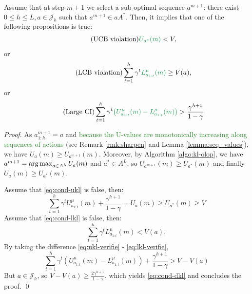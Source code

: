 \documentclass[runningheads, envcountsame, a4paper]{llncs}
\newcommand{\diff}[1]{\textcolor{ForestGreen}{#1}}
\begin{document}
\begin{lemma}
\label{lemma:sub-optimal-pull}
Assume that at step $m+1$ we select a sub-optimal sequence $a^{m+1}$: there exist $0 \leq h \leq L,  a\in \mathcal{J}_h$ such that $a^{m+1} \in aA^*$. Then, it implies that one of the following propositions is true:
\begin{equation}
\label{eq:cond-ukl}
\tag{UCB violation}
    \diff{U_{a^*}(m)} < V,
\end{equation}
or
\begin{equation}
\tag{LCB violation}
\label{eq:cond-lkl}
    \sum_{t=1}^h \gamma^t \diff{L^{\mu}_{a_{1:t}}(m)} \geq V(a),
\end{equation}
or
\begin{equation}
\tag{Large CI}
\label{eq:cond-dkl}
    \sum_{t=1}^h \gamma^t\diff{\left(U^{\mu}_{a_{1:t}}(m) - L^{\mu}_{a_{1:t}}(m)\right)} > \frac{\gamma^{h+1}}{1-\gamma}
\end{equation}
\end{lemma}
\begin{proof}
As $a^{m+1}_{1:h} = a$ and \diff{because the U-values are monotonically increasing along sequences of actions} (see Remark \ref{rmk:sharpen} and Lemma \ref{lemma:seq_values}), we have $U_a(m) \geq U_{a^{m+1}}(m)$. Moreover, by Algorithm \ref{algo:kl-olop}, we have $a^{m+1} = \operatorname*{arg\,max}_{a \in A^L}  U_a(m)$ and $a^*\in A^L$, so $U_{a^{m+1}}(m) \geq U_{a^*}(m)$ and finally $U_a(m) \geq U_{a^*}(m)$.

Assume that \eqref{eq:cond-ukl} is false, then:
\begin{equation}
\label{eq:ukl-verifie}
    \sum_{t=1}^h \gamma^t U^{\mu}_{a_{1:t}}(m) + \frac{\gamma^{h+1}}{1-\gamma} = U_a(m) \geq U_{a^*}(m) \geq V
\end{equation}
Assume that \eqref{eq:cond-lkl} is false, then:
\begin{equation}
\label{eq:lkl-verifie}
    \sum_{t=1}^h \gamma^t L^{\mu}_{a_{1:t}}(m) < V(a),
\end{equation}
By taking the difference \eqref{eq:ukl-verifie} - \eqref{eq:lkl-verifie}, 
\begin{equation*}
    \sum_{t=1}^h \gamma^t \left(U^{\mu}_{a_{1:t}}(m) - L^{\mu}_{a_{1:t}}(m)\right) + \frac{\gamma^{h+1}}{1-\gamma} > V - V(a)
\end{equation*}
But $a \in \mathcal{J}_h$, so $V - V(a) \geq \frac{2\gamma^{h+1}}{1-\gamma}$, which yields \eqref{eq:cond-dkl} and concludes the proof.
\qed
\end{proof}
\end{document}
